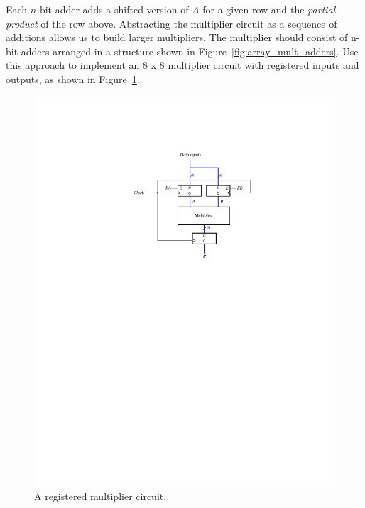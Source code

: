 \documentclass[epsfig,10pt,fullpage]{article}
\begin{document}
Each $n$-bit adder adds a shifted version of $A$ for a given row and the {\it partial
product} of the row above. Abstracting the multiplier circuit as a sequence of additions 
allows us to build larger multipliers. The multiplier should consist of n-bit adders
arranged in a structure shown in Figure~\ref{fig:array_mult_adders}. Use this approach to 
implement an 8 {\sf x} 8 multiplier circuit with registered
inputs and outputs, as shown in Figure~\ref{fig:registered_mult}.

\begin{figure}[H]
\centerline{
\includegraphics{figures/registered_mult}}
\caption{A registered multiplier circuit.}
\label{fig:registered_mult}
\end{figure}
\end{document}
